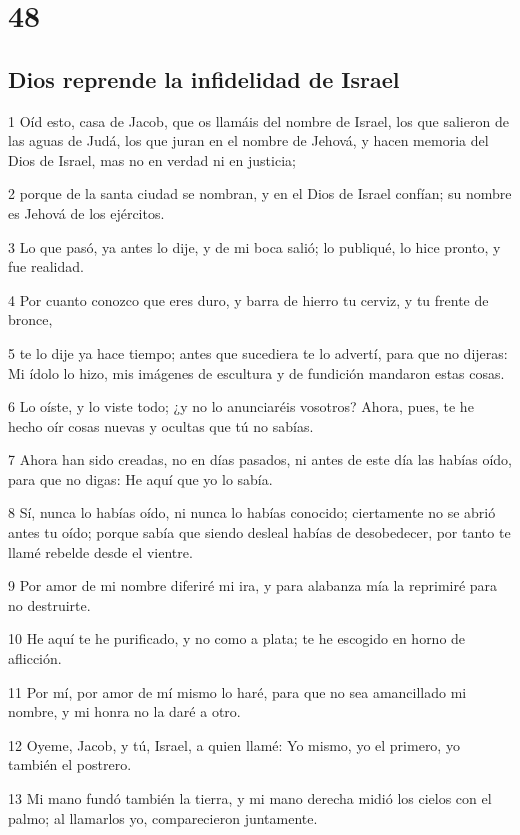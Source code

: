 \chapter{48}

\section*{Dios reprende la infidelidad de Israel}

\par 1 Oíd esto, casa de Jacob, que os llamáis del nombre de Israel, los que salieron de las aguas de Judá, los que juran en el nombre de Jehová, y hacen memoria del Dios de Israel, mas no en verdad ni en justicia;
\par 2 porque de la santa ciudad se nombran, y en el Dios de Israel confían; su nombre es Jehová de los ejércitos.
\par 3 Lo que pasó, ya antes lo dije, y de mi boca salió; lo publiqué, lo hice pronto, y fue realidad.
\par 4 Por cuanto conozco que eres duro, y barra de hierro tu cerviz, y tu frente de bronce,
\par 5 te lo dije ya hace tiempo; antes que sucediera te lo advertí, para que no dijeras: Mi ídolo lo hizo, mis imágenes de escultura y de fundición mandaron estas cosas.
\par 6 Lo oíste, y lo viste todo; ¿y no lo anunciaréis vosotros? Ahora, pues, te he hecho oír cosas nuevas y ocultas que tú no sabías.
\par 7 Ahora han sido creadas, no en días pasados, ni antes de este día las habías oído, para que no digas: He aquí que yo lo sabía.
\par 8 Sí, nunca lo habías oído, ni nunca lo habías conocido; ciertamente no se abrió antes tu oído; porque sabía que siendo desleal habías de desobedecer, por tanto te llamé rebelde desde el vientre.
\par 9 Por amor de mi nombre diferiré mi ira, y para alabanza mía la reprimiré para no destruirte.
\par 10 He aquí te he purificado, y no como a plata; te he escogido en horno de aflicción.
\par 11 Por mí, por amor de mí mismo lo haré, para que no sea amancillado mi nombre, y mi honra no la daré a otro. 
\par 12 Oyeme, Jacob, y tú, Israel, a quien llamé: Yo mismo, yo el primero, yo también el postrero. 
\par 13 Mi mano fundó también la tierra, y mi mano derecha midió los cielos con el palmo; al llamarlos yo, comparecieron juntamente.
